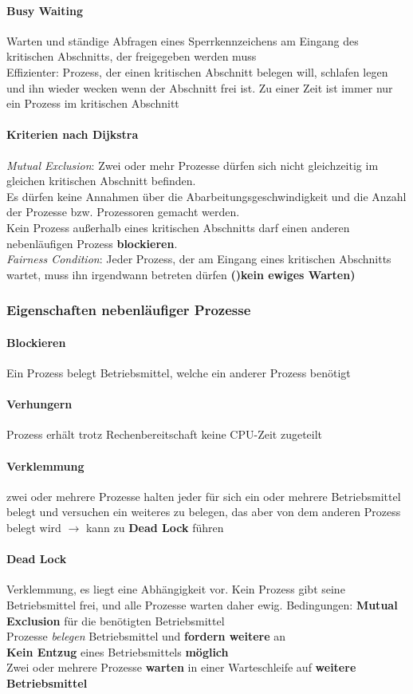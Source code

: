 \documentclass[11pt,a4paper,landscape]{article}
\begin{document}
\begin{multicols*}{3}
	\paragraph{Busy Waiting} Warten und ständige Abfragen eines Sperrkennzeichens am Eingang des kritischen Abschnitts, der freigegeben werden muss\\
	Effizienter: Prozess, der einen kritischen Abschnitt belegen will, schlafen legen und ihn wieder wecken wenn der Abschnitt frei ist. Zu einer Zeit ist immer nur ein Prozess im kritischen Abschnitt
	\paragraph{Kriterien nach Dijkstra} \textit{Mutual Exclusion}: Zwei oder mehr Prozesse dürfen sich nicht gleichzeitig im gleichen kritischen Abschnitt befinden.\\ Es dürfen keine Annahmen über die Abarbeitungsgeschwindigkeit und die Anzahl der Prozesse bzw. Prozessoren gemacht werden.\\ Kein Prozess außerhalb eines kritischen Abschnitts darf einen anderen nebenläufigen Prozess
	\textbf{blockieren}. \\\textit{Fairness Condition}: Jeder Prozess, der am Eingang eines kritischen Abschnitts wartet, muss ihn irgendwann betreten dürfen \textbf{()kein ewiges Warten)}
	\subsubsection{Eigenschaften nebenläufiger Prozesse}
	\paragraph{Blockieren} Ein Prozess belegt Betriebsmittel, welche ein anderer Prozess benötigt
	\paragraph{Verhungern} Prozess erhält trotz Rechenbereitschaft keine CPU-Zeit zugeteilt
	\paragraph{Verklemmung} zwei oder mehrere Prozesse halten jeder für sich ein oder mehrere Betriebsmittel belegt und versuchen ein weiteres zu belegen, das aber von dem anderen Prozess belegt wird $\rightarrow$ kann zu \textbf{Dead Lock} führen
	\paragraph{Dead Lock} Verklemmung, es liegt eine Abhängigkeit vor. Kein Prozess gibt seine Betriebsmittel frei, und alle Prozesse warten daher ewig. Bedingungen: \textbf{Mutual Exclusion} für die benötigten Betriebsmittel\\ Prozesse \textit{belegen} Betriebsmittel und \textbf{fordern weitere} an\\ \textbf{Kein Entzug} eines Betriebsmittels \textbf{möglich}\\ Zwei oder mehrere Prozesse \textbf{warten} in einer Warteschleife auf \textbf{weitere Betriebsmittel}

\end{multicols*}
\end{document}
